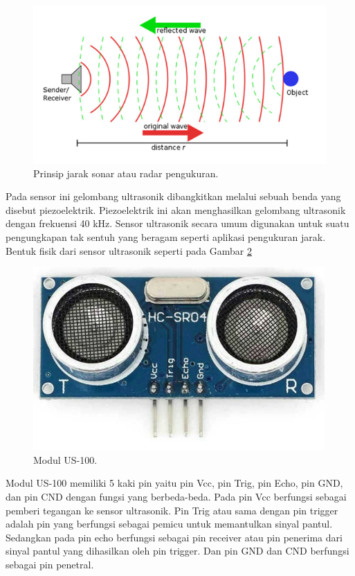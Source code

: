 \begin{figure}[h!]
	\centering
	\includegraphics[width=0.7\linewidth]{"gambar/diagram kerja sensor ultrasonic"}
	\caption{Prinsip jarak sonar atau radar pengukuran.}
	\label{fig:diagram-kerja-sensor-ultrasonic}
\end{figure}

Pada sensor ini gelombang ultrasonik dibangkitkan melalui sebuah benda yang disebut piezoelektrik. Piezoelektrik ini akan menghasilkan gelombang 
ultrasonik dengan frekuensi 40 kHz. Sensor ultrasonik secara umum digunakan untuk suatu pengungkapan tak sentuh yang beragam seperti aplikasi 
pengukuran jarak. Bentuk fisik dari sensor ultrasonik seperti pada Gambar \ref{fig:sensor-ultrasonic}


\begin{figure}[h!]
	\centering
	\includegraphics[width=0.5\linewidth]{"gambar/sensor ultrasonic"}
	\caption{Modul US-100.}
	\label{fig:sensor-ultrasonic}
\end{figure}

Modul US-100 memiliki 5 kaki pin yaitu pin Vcc, pin Trig, pin Echo, pin GND, dan pin CND dengan fungsi yang berbeda-beda. Pada pin Vcc berfungsi 
sebagai pemberi tegangan ke sensor ultrasonik. Pin Trig atau sama dengan pin trigger adalah pin yang berfungsi sebagai pemicu untuk memantulkan 
sinyal pantul. Sedangkan pada pin echo berfungsi sebagai pin receiver atau pin penerima dari sinyal pantul yang dihasilkan oleh pin trigger. 
Dan pin GND dan CND berfungsi sebagai pin penetral.


